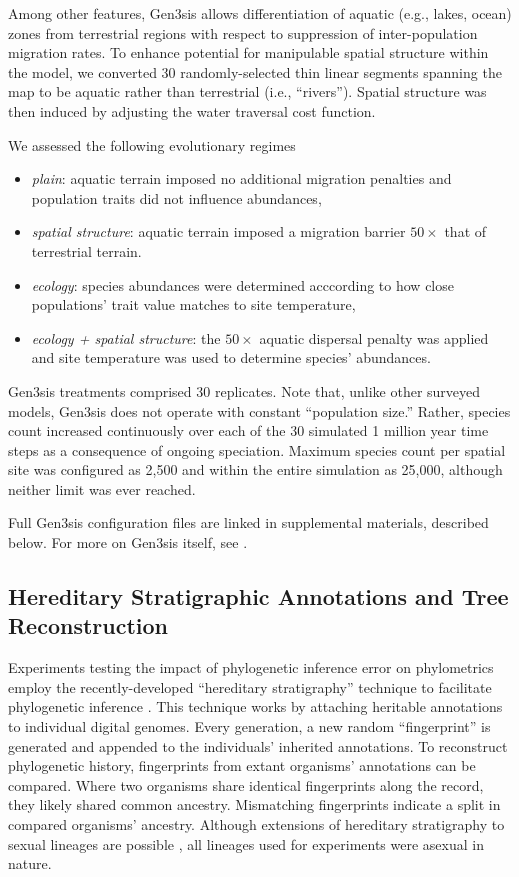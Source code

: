 Among other features, Gen3sis allows differentiation of aquatic (e.g., lakes, ocean) zones from terrestrial regions with respect to suppression of inter-population migration rates.
To enhance potential for manipulable spatial structure within the model, we converted 30 randomly-selected thin linear segments spanning the map to be aquatic rather than terrestrial (i.e., ``rivers'').
Spatial structure was then induced by adjusting the water traversal cost function.

We assessed the following evolutionary regimes
\begin{itemize}
\item \textit{plain}: aquatic terrain imposed no additional migration penalties and population traits did not influence abundances,
\item \textit{spatial structure}: aquatic terrain imposed a migration barrier $50\times$ that of terrestrial terrain.
\item \textit{ecology}: species abundances were determined acccording to how close populations' trait value matches to site temperature,
\item \textit{ecology + spatial structure}: the $50\times$ aquatic dispersal penalty was applied and site temperature was used to determine species' abundances.
\end{itemize}

Gen3sis treatments comprised 30 replicates.
Note that, unlike other surveyed models, Gen3sis does not operate with constant ``population size.''
Rather, species count increased continuously over each of the 30 simulated 1 million year time steps as a consequence of ongoing speciation.
Maximum species count per spatial site was configured as 2,500 and within the entire simulation as 25,000, although neither limit was ever reached.

Full Gen3sis configuration files are linked in supplemental materials, described below.
For more on Gen3sis itself, see \citep{hagen2021gen3sis}.

\subsection{Hereditary Stratigraphic Annotations and Tree Reconstruction}

Experiments testing the impact of phylogenetic inference error on phylometrics employ the recently-developed ``hereditary stratigraphy'' technique to facilitate phylogenetic inference \citep{moreno2022hstrat}.
This technique works by attaching heritable annotations to individual digital genomes.
Every generation, a new random ``fingerprint'' is generated and appended to the individuals' inherited annotations.
To reconstruct phylogenetic history, fingerprints from extant organisms' annotations can be compared.
Where two organisms share identical fingerprints along the record, they likely shared common ancestry.
Mismatching fingerprints indicate a split in compared organisms' ancestry.
Although extensions of hereditary stratigraphy to sexual lineages are possible \citep{moreno2024methods}, all lineages used for experiments were asexual in nature.

